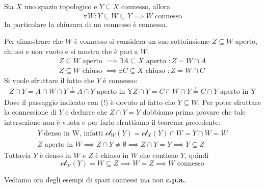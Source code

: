 \begin{theorema}\label{chiusuraconnessa}
	Sia $X$ uno spazio topologico e $Y\subseteq X$ connesso, allora 
		\begin{equation*}
			\forall W \colon Y\subseteq W \subseteq \overline{Y} \implies W \text{ connesso}
		\end{equation*}
	In particolare la chiusura di un connesso è connessa.
\end{theorema}
\begin{demonstration}
	Per dimostrare che $W$ è connesso si considera un suo sottoinsieme $Z\subseteq W$ aperto, chiuso e non vuoto e si mostra che è pari a $W$.
		\begin{gather*}
			Z\subseteq W \text{ aperto } \implies \exists A\subseteq X \text{ aperto } \colon Z=W\cap A \\
			Z\subseteq W \text{ chiuso } \implies \exists C\subseteq X \text{ chiuso } \colon Z=W\cap C
		\end{gather*}
	Si vuole sfruttare il fatto che $Y$ è connesso:
		\begin{gather*}
			Z\cap Y=A\cap W\cap Y \stackrel{!}{=} A\cap Y \text{ aperto in Y}
			Z\cap Y=C\cap W\cap Y \stackrel{!}{=} C\cap Y \text{ aperto in Y}			
		\end{gather*}
	Dove il passaggio indicato con (!) è dovuto al fatto che $Y\subseteq W$. Per poter sfruttare la connessione di $Y$ e dedurre che $Z\cap Y=Y$ dobbiamo prima provare che tale intersezione non è vuota e per farlo sfruttiamo il teorema precedente:
		\begin{gather*}
			Y \text{ denso in W, infatti  } \mathcal{cl}_W(Y)=\mathcal{cl}_X(Y)\cap W=\overline{Y}\cap W=W\\
			Z \text{ aperto in } W \implies Z\cap Y \neq \emptyset \implies Z\cap Y=Y \implies Y\subseteq Z
		\end{gather*}
	Tuttavia $Y$ è denso in $W$ e $Z$ è chiuso in $W$ che contiene $Y$, quindi 
		\begin{equation*}
			\mathcal{cl}_W(Y)=W\subseteq Z \implies W=Z \implies W \text{ connesso}
		\end{equation*}
\end{demonstration}
Vediamo ora degli esempi di spazi connessi ma non \textbf{c.p.a.}.

